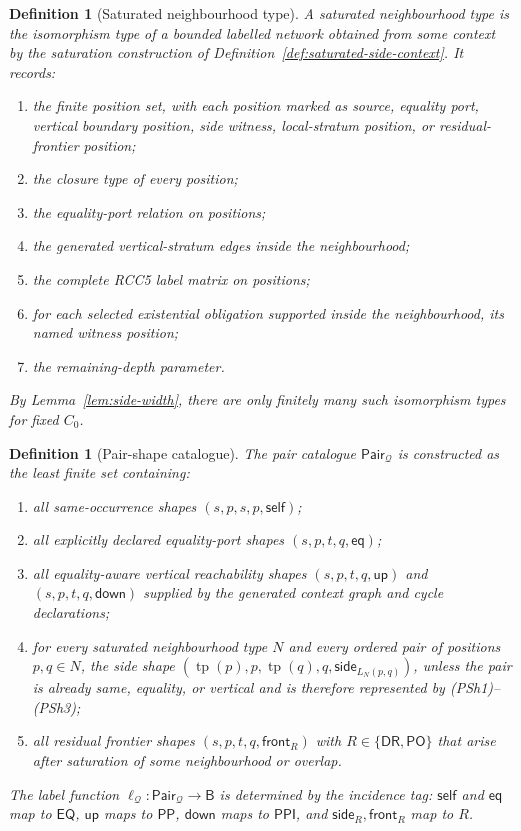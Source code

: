 \documentclass[11pt]{article}
\newtheorem{definition}[theorem]{Definition}
\newcommand{\Base}{\mathsf B}
\newcommand{\EQ}{\mathsf{EQ}}
\newcommand{\DR}{\mathsf{DR}}
\newcommand{\PO}{\mathsf{PO}}
\newcommand{\PP}{\mathsf{PP}}
\newcommand{\PPI}{\mathsf{PPI}}
\newcommand{\Q}{\mathcal Q}
\newcommand{\Pair}{\mathsf{Pair}}
\newcommand{\typ}{\operatorname{tp}}
\newcommand{\up}{\mathsf{up}}
\newcommand{\down}{\mathsf{down}}
\newcommand{\self}{\mathsf{self}}
\newcommand{\eqtag}{\mathsf{eq}}
\newcommand{\side}{\mathsf{side}}
\newcommand{\front}{\mathsf{front}}
\begin{document}
\begin{definition}[Saturated neighbourhood type]\label{def:sat-neighborhood-type}
A saturated neighbourhood type is the isomorphism type of a bounded labelled network obtained from some context by the saturation construction of Definition~\ref{def:saturated-side-context}.  It records:
\begin{enumerate}[label=(N\arabic*)]
\item the finite position set, with each position marked as source, equality port, vertical boundary position, side witness, local-stratum position, or residual-frontier position;
\item the closure type of every position;
\item the equality-port relation on positions;
\item the generated vertical-stratum edges inside the neighbourhood;
\item the complete RCC5 label matrix on positions;
\item for each selected existential obligation supported inside the neighbourhood, its named witness position;
\item the remaining-depth parameter.
\end{enumerate}
By Lemma~\ref{lem:side-width}, there are only finitely many such isomorphism types for fixed $C_0$.
\end{definition}

\begin{definition}[Pair-shape catalogue]\label{def:pair-shape}
The pair catalogue $\Pair_\Q$ is constructed as the least finite set containing:
\begin{enumerate}[label=(PSh\arabic*)]
\item all same-occurrence shapes $(s,p,s,p,\self)$;
\item all explicitly declared equality-port shapes $(s,p,t,q,\eqtag)$;
\item all equality-aware vertical reachability shapes $(s,p,t,q,\up)$ and $(s,p,t,q,\down)$ supplied by the generated context graph and cycle declarations;
\item for every saturated neighbourhood type $N$ and every ordered pair of positions $p,q\in N$, the side shape $(\typ(p),p,\typ(q),q,\side_{L_N(p,q)})$, unless the pair is already same, equality, or vertical and is therefore represented by (PSh1)--(PSh3);
\item all residual frontier shapes $(s,p,t,q,\front_R)$ with $R\in\{\DR,\PO\}$ that arise after saturation of some neighbourhood or overlap.
\end{enumerate}
The label function $\ell_\Q:\Pair_\Q\to\Base$ is determined by the incidence tag: $\self$ and $\eqtag$ map to $\EQ$, $\up$ maps to $\PP$, $\down$ maps to $\PPI$, and $\side_R,\front_R$ map to $R$.
\end{definition}
\end{document}
